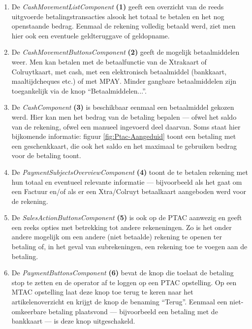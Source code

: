 \begin{enumerate}
    \item De \emph{CashMovementListComponent} \textbf{(1)} geeft een overzicht van de reeds uitgvoerde betalingstransacties alsook het totaal te betalen en het nog openstaande bedrag. Eenmaal de rekening volledig betaald werd, ziet men hier ook een eventuele geldteruggave of geldopname.
    \item De \emph{CashMovementButtonsComponent} \textbf{(2)} geeft de mogelijk betaalmiddelen weer. Men kan betalen met de betaalfunctie van de Xtrakaart of Colruytkaart, met cash, met een elektronisch betaalmiddel (bankkaart, maaltijdcheques etc.) of met MPAY. Minder gangbare betaalmiddelen zijn toegankelijk via de knop ``Betaalmiddelen...''.
    \item De \emph{CashComponent} \textbf{(3)} is beschikbaar eenmaal een betaalmiddel gekozen werd. Hier kan men het bedrag van de betaling bepalen — ofwel het saldo van de rekening, ofwel een manueel ingevoerd deel daarvan. Soms staat hier bijkomende informatie: figuur \ref{fig:Ptac-Aangeduid} toont een betaling met een geschenkkaart, die ook het saldo en het maximaal te gebruiken bedrag voor de betaling toont.
    \item De \emph{PaymentSubjectsOverviewComponent} \textbf{(4)} toont de te betalen rekening met hun totaal en eventueel relevante informatie — bijvoorbeeld als het gaat om een Factuur en/of als er een Xtra/Colruyt betaalkaart aangeboden werd voor de rekening.
    \item De \emph{SalesActionButtonsComponent} \textbf{(5)} is ook op de PTAC aanwezig en geeft een reeks opties met betrekking tot andere rekeneningen. Zo is het onder andere mogelijk om een andere (niet betaalde) rekening te openen ter betaling of, in het geval van subrekeningen, een rekening toe te voegen aan de betaling.
    \item De \emph{PaymentButtonsComponent} \textbf{(6)} bevat de knop die toelaat de betaling stop te zetten en de operator af te loggen op een PTAC opstelling. Op een MTAC opstelling laat deze knop toe terug te keren naar het artikelenoverzicht en krijgt de knop de benaming ``Terug''. Eenmaal een niet-omkeerbare betaling plaatsvond — bijvoorbeeld een betaling met de bankkaart — is deze knop uitgeschakeld.
\end{enumerate}